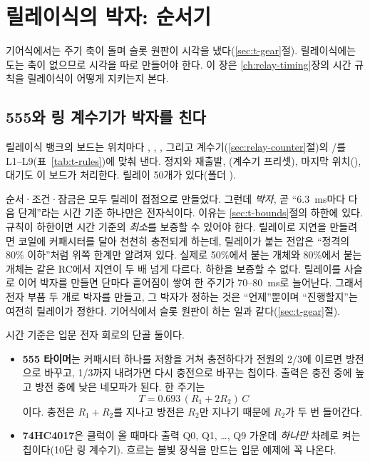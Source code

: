 \chapter{릴레이식의 박자: 순서기}\label{ch:relay-sequencer}

기어식에서는 주기 축이 돌며 슬롯 원판이 시각을 냈다(\ref{sec:t-gear}절). 릴레이식에는 도는 축이 없으므로 시각을
따로 만들어야 한다. 이 장은 \ref{ch:relay-timing}장의 시간 규칙을 릴레이식이 어떻게 지키는지 본다.

\section{555와 링 계수기가 박자를 친다}\label{sec:t-sequencer}

릴레이식 뱅크의  보드는 위치마다 ,
, , 그리고 계수기(\ref{sec:relay-counter}절)의 /를 L1--L9(표~\ref{tab:t-rules})에 맞춰 낸다. 정지와 재출발,
(계수기 프리셋), 마지막 위치(), 대기도 이 보드가 처리한다. 릴레이 50개가 있다(폴더
).

\Why 순서·조건·잠금은 모두 릴레이 접점으로 만들었다. 그런데 \emph{박자}, 곧 ``6.3~ms마다 다음 단계''라는 시간
기준 하나만은 전자식이다. 이유는 \ref{sec:t-bounds}절의 하한에 있다. 규칙이 하한이면 시간 기준의 \emph{최소}를
보증할 수 있어야 한다. 릴레이로 지연을 만들려면 코일에 커패시터를 달아 천천히 충전되게 하는데, 릴레이가 붙는
전압은 ``정격의 80\% 이하''처럼 위쪽 한계만 알려져 있다. 실제로 50\%에서 붙는 개체와 80\%에서 붙는 개체는 같은
RC에서 지연이 두 배 넘게 다르다. 하한을 보증할 수 없다. 릴레이를 사슬로 이어 박자를 만들면 단마다 흩어짐이
쌓여 한 주기가 70--80~ms로 늘어난다. 그래서 전자 부품 두 개로 박자를 만들고, 그 박자가 정하는 것은 ``언제''뿐이며
``진행할지''는 여전히 릴레이가 정한다. 기어식에서 슬롯 원판이 하는 일과 같다(\ref{sec:t-gear}절).

\General 시간 기준은 입문 전자 회로의 단골 둘이다.
\begin{itemize}
\item \textbf{555 타이머}는 커패시터 하나를 저항을 거쳐 충전하다가 전원의 2/3에 이르면 방전으로 바꾸고, 1/3까지
내려가면 다시 충전으로 바꾸는 칩이다. 출력은 충전 중에 높고 방전 중에 낮은 네모파가 된다. 한 주기는
\[
  T = 0.693\,(R_1 + 2R_2)\,C
\]
이다. 충전은 $R_1 + R_2$를 지나고 방전은 $R_2$만 지나기 때문에 $R_2$가 두 번 들어간다.
\item \textbf{74HC4017}은 클럭이 올 때마다 출력 Q0, Q1, \ldots, Q9 가운데 \emph{하나만} 차례로 켜는 칩이다(10단
링 계수기). 흐르는 불빛 장식을 만드는 입문 예제에 꼭 나온다.
\end{itemize}

